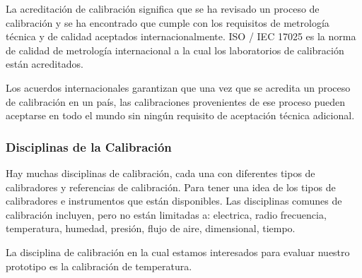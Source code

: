 \par \noindent
La acreditación de calibración significa que se ha revisado un proceso de calibración y se ha encontrado que cumple con los requisitos de metrología técnica y de calidad aceptados internacionalmente. ISO / IEC 17025 es la norma de calidad de metrología internacional a la cual los laboratorios de calibración están acreditados.

\par \noindent
Los acuerdos internacionales garantizan que una vez que se acredita un proceso de calibración en un país, las calibraciones provenientes de ese proceso pueden aceptarse en todo el mundo sin ningún requisito de aceptación técnica adicional.

\subsubsection{Disciplinas de la Calibración \cite{calibracion-fluke}}

\par 
Hay muchas disciplinas de calibración, cada una con diferentes tipos de calibradores y referencias de calibración. Para tener una idea de los tipos de calibradores e instrumentos que están disponibles. Las disciplinas comunes de calibración incluyen, pero no están limitadas a: electrica, radio frecuencia, temperatura, humedad, presión, flujo de aire, dimensional, tiempo.

\par \noindent
La disciplina de calibración en la cual estamos interesados para evaluar nuestro prototipo es la calibración de temperatura.

\clearpage

